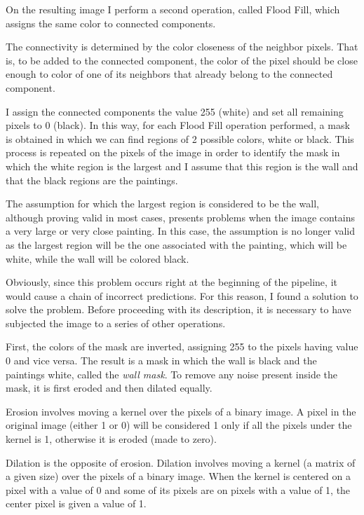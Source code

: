 \documentclass[10pt,twocolumn,letterpaper]{article}
\begin{document}
On the resulting image I perform a second operation, called Flood Fill, which assigns the same color to connected components.

The connectivity is determined by the color closeness of the neighbor pixels. That is, to be added to the connected component, the color of the pixel should be close enough to color of one of its neighbors that already belong to the connected component.

I assign the connected components the value 255 (white) and set all remaining pixels to 0 (black). In this way, for each Flood Fill operation performed, a mask is obtained in which we can find regions of 2 possible colors, white or black. This process is repeated on the pixels of the image in order to identify the mask in which the white region is the largest and I assume that this region is the wall and that the black regions are the paintings.

The assumption for which the largest region is considered to be the wall, although proving valid in most cases, presents problems when the image contains a very large or very close painting. In this case, the assumption is no longer valid as the largest region will be the one associated with the painting, which will be white, while the wall will be colored black.

Obviously, since this problem occurs right at the beginning of the pipeline, it would cause a chain of incorrect predictions. For this reason, I found a solution to solve the problem. Before proceeding with its description, it is necessary to have subjected the image to a series of other operations.

First, the colors of the mask are inverted, assigning 255 to the pixels having value 0 and vice versa. The result is a mask in which the wall is black and the paintings white, called the \textit{wall mask}. To remove any noise present inside the mask, it is first eroded and then dilated equally.

Erosion involves moving a kernel over the pixels of a binary image. A pixel in the original image (either 1 or 0) will be considered 1 only if all the pixels under the kernel is 1, otherwise it is eroded (made to zero).

Dilation is the opposite of erosion. Dilation involves moving a kernel (a matrix of a given size) over the pixels of a binary image. When the kernel is centered on a pixel with a value of 0 and some of its pixels are on pixels with a value of 1, the center pixel is given a value of 1.
\end{document}

